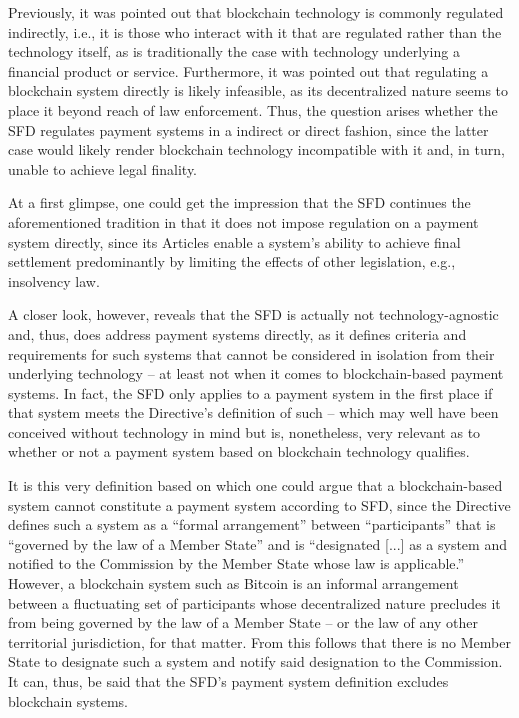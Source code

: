 Previously, it was pointed out that blockchain technology is commonly regulated indirectly, i.e., it is those who interact with it that are regulated rather than the technology itself, as is traditionally the case with technology underlying a financial product or service.
Furthermore, it was pointed out that regulating a blockchain system directly is likely infeasible, as its decentralized nature seems to place it beyond reach of law enforcement.
Thus, the question arises whether the SFD regulates payment systems in a indirect or direct fashion, since the latter case would likely render blockchain technology incompatible with it and, in turn, unable to achieve legal finality.

At a first glimpse, one could get the impression that the SFD continues the aforementioned tradition in that it does not impose regulation on a payment system directly, since its Articles enable a system's ability to achieve final settlement predominantly by limiting the effects of other legislation, e.g., insolvency law.

A closer look, however, reveals that the SFD is actually not technology-agnostic and, thus, does address payment systems directly, as it defines criteria and requirements for such systems that cannot be considered in isolation from their underlying technology -- at least not when it comes to blockchain-based payment systems.
In fact, the SFD only applies to a payment system in the first place if that system meets the Directive's definition of such \autocite[Article 2(a)]{eu1998sfd} -- which may well have been conceived without technology in mind but is, nonetheless, very relevant as to whether or not a payment system based on blockchain technology qualifies.

It is this very definition based on which one could argue that a blockchain-based system cannot constitute a payment system according to SFD, since the Directive defines such a system as a ``formal arrangement'' between ``participants'' that is ``governed by the law of a Member State'' and is ``designated [...] as a system and notified to the Commission by the Member State whose law is applicable.'' \autocite{eu1998sfd}
However, a blockchain system such as Bitcoin is an informal arrangement between a fluctuating set of participants whose decentralized nature precludes it from being governed by the law of a Member State -- or the law of any other territorial jurisdiction, for that matter.
From this follows that there is no Member State to designate such a system and notify said designation to the Commission.
It can, thus, be said that the SFD's payment system definition excludes blockchain systems.

